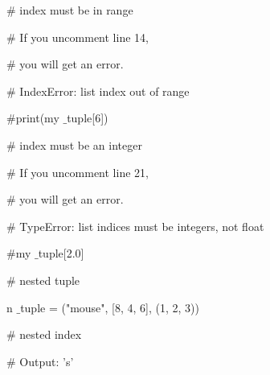 \documentclass[a4paper,12pt]{report}
\begin{document}
\vspace{20pt}
\noindent 
{\fontsize{20pt}{20pt}\selectfont  $  \#  $ index must be in range \\} \par
\noindent 
{\fontsize{20pt}{20pt}\selectfont  $  \#  $ If you uncomment line 14, \\} \par
\noindent 
{\fontsize{20pt}{20pt}\selectfont  $  \#  $ you will get an error. \\} \par
\noindent 
{\fontsize{20pt}{20pt}\selectfont  $  \#  $ IndexError: list index out of range \\} \par
\vspace{20pt}
\noindent 
{\fontsize{20pt}{20pt}\selectfont  $  \#  $print(my $  \_  $tuple[6]) \\} \par
\vspace{20pt}
\noindent 
{\fontsize{20pt}{20pt}\selectfont  $  \#  $ index must be an integer \\} \par
\noindent 
{\fontsize{20pt}{20pt}\selectfont  $  \#  $ If you uncomment line 21, \\} \par
\noindent 
{\fontsize{20pt}{20pt}\selectfont  $  \#  $ you will get an error. \\} \par
\noindent 
{\fontsize{20pt}{20pt}\selectfont  $  \#  $ TypeError: list indices must be integers, not float \\} \par
\vspace{20pt}
\noindent 
{\fontsize{20pt}{20pt}\selectfont  $  \#  $my $  \_  $tuple[2.0] \\} \par
\vspace{20pt}
\noindent 
{\fontsize{20pt}{20pt}\selectfont  $  \#  $ nested tuple \\} \par
\noindent 
{\fontsize{20pt}{20pt}\selectfont n $  \_  $tuple = ("mouse", [8, 4, 6], (1, 2, 3)) \\} \par
\vspace{20pt}
\noindent 
{\fontsize{20pt}{20pt}\selectfont  $  \#  $ nested index \\} \par
\noindent 
{\fontsize{20pt}{20pt}\selectfont  $  \#  $ Output: 's' \\} \par
\end{document}
